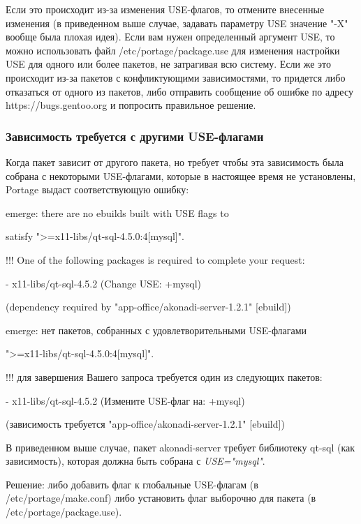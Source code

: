 \documentclass[10pt]{book}
\begin{document}
Если это происходит из-за изменения USE-флагов, то отмените внесенные изменения (в приведенном выше случае, задавать параметру USE значение "-X" вообще была плохая идея). Если вам нужен определенный аргумент USE, то можно использовать файл  /etc/portage/package.use для изменения настройки USE для одного или более пакетов, не затрагивая всю систему. Если же это происходит из-за пакетов с конфликтующими зависимостями, то придется либо отказаться от одного из пакетов, либо отправить сообщение об ошибке по адресу https://bugs.gentoo.org и попросить правильное решение.

\subsubsection{Зависимость требуется с другими USE-флагами}

Когда пакет зависит от другого пакета, но требует чтобы эта зависимость была собрана с некоторыми USE-флагами, которые в настоящее время не установлены, Portage выдаст соответствующую ошибку:

 \begin{tcolorbox}
emerge: there are no ebuilds built with USE flags to

satisfy ">=x11-libs/qt-sql-4.5.0:4[mysql]".

!!! One of the following packages is required to complete your request:

- x11-libs/qt-sql-4.5.2 (Change USE: +mysql)

(dependency required by "app-office/akonadi-server-1.2.1" [ebuild])
\end{tcolorbox}
 \begin{tcolorbox}
emerge: нет пакетов, собранных с удовлетворительными USE-флагами 

">=x11-libs/qt-sql-4.5.0:4[mysql]".

!!! для завершения Вашего запроса требуется один из следующих пакетов:

- x11-libs/qt-sql-4.5.2 (Измените USE-флаг на: +mysql)

(зависимость требуется "app-office/akonadi-server-1.2.1" [ebuild])
\end{tcolorbox}
В приведенном выше случае, пакет  akonadi-server требует библиотеку qt-sql (как зависимость), которая должна быть собрана с \textit{USE="mysql"}. 

Решение: либо добавить флаг к глобальные USE-флагам (в  /etc/portage/make.conf) либо установить флаг выборочно для пакета (в  /etc/portage/package.use).
\end{document}
